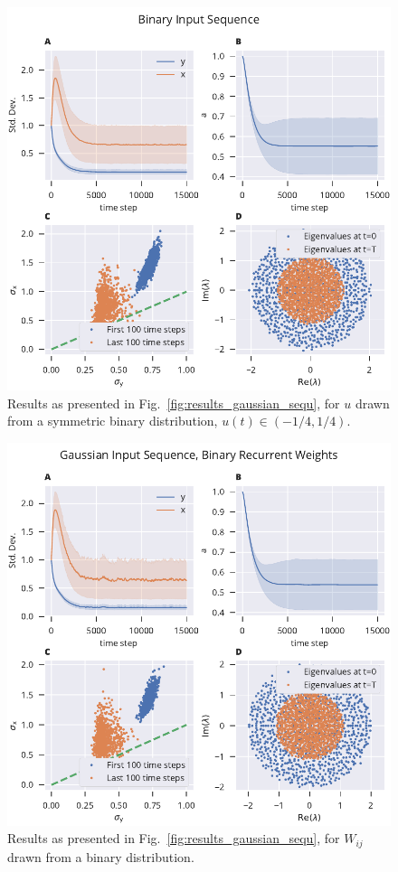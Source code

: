 \documentclass[12pt]{article}
\begin{document}
\begin{figure}[ht]
	\includegraphics{../../plots/alternative_mech/composite_binary_sequ.pdf}
	\caption{Results as presented in Fig.~\ref{fig:results_gaussian_sequ}, for $u$ drawn from a symmetric binary distribution, $u(t) \in (-1/4,1/4)$.}
	\label{fig:results_binary_sequ}
\end{figure}

\begin{figure}[ht]
	\includegraphics{../../plots/alternative_mech/composite_binary_matrix.pdf}
	\caption{Results as presented in Fig.~\ref{fig:results_gaussian_sequ}, for $W_{ij}$ drawn from a binary distribution.}
	\label{fig:results_binary_matrix}
\end{figure}
\end{document}
